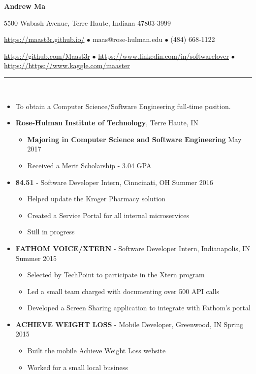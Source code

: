 \documentclass[10pt]{article} %
\begin{document}
\centerline{\LARGE \textbf{Andrew Ma}}  %
\noindent %
\centerline {5500 Wabash Avenue, Terre Haute, Indiana 47803-3999}
\centerline{ \url{https://maast3r.github.io/} $\bullet$ maas@rose-hulman.edu $\bullet$ (484) 668-1122}
\centerline{\url{https://github.com/Maast3r} $\bullet$ \url{https://www.linkedin.com/in/softwarelover} $\bullet$ \url{https://https://www.kaggle.com/maaster}}

\noindent\rule{16.5cm}{0.4pt} %
\\  %
\begin{itemize}
	\item[] To obtain a Computer Science/Software Engineering full-time position.
\end{itemize}
\normalsize \begin{itemize}
	\item[] \normalsize \textbf{Rose-Hulman Institute of Technology}, Terre Haute, IN
	\begin{itemize}
		\item \normalsize \textbf{Majoring in Computer Science and Software Engineering} \hfill May 2017
		\item \normalsize Received a Merit Scholarship - 3.04 GPA
	\end{itemize}
\end{itemize}
\begin{itemize}
	\item[] \textbf{ 84.51\degree} - Software Developer Intern, Cinncinati, OH \hfill{Summer 2016}
	\begin{itemize}
		\item Helped update the Kroger Pharmacy solution
		\item Created a Service Portal for all internal microservices
		\item Still in progress
	\end{itemize}
	\item[] \textbf{\small FATHOM VOICE/XTERN} - Software Developer Intern, Indianapolis, IN \hfill{Summer 2015}
	\begin{itemize}
		\item Selected by TechPoint to participate in the Xtern program
		\item Led a small team charged with documenting over 500 API calls
		\item Developed a Screen Sharing application to integrate with Fathom's portal
	\end{itemize}
	\item[] \textbf{\small ACHIEVE WEIGHT LOSS} - Mobile Developer, Greenwood, IN \hfill{Spring 2015}
	\begin{itemize}
		\item Built the mobile Achieve Weight Loss website
		\item Worked for a small local business 
	\end{itemize}
\end{itemize}
\end{document}
